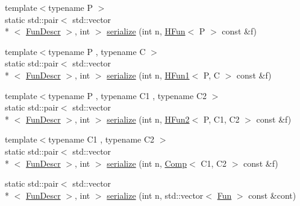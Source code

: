 \begin{DoxyCompactItemize}
\item 
{\footnotesize template$<$typename P $>$ }\\static std\+::pair$<$ std\+::vector\\*
$<$ \hyperlink{structpfq__lang_1_1FunDescr}{Fun\+Descr} $>$, int $>$ \hyperlink{namespacepfq__lang_1_1term_a5cb0871466843f156dd63407d108cf64}{serialize} (int n, \hyperlink{structpfq__lang_1_1term_1_1HFun}{H\+Fun}$<$ P $>$ const \&f)
\item 
{\footnotesize template$<$typename P , typename C $>$ }\\static std\+::pair$<$ std\+::vector\\*
$<$ \hyperlink{structpfq__lang_1_1FunDescr}{Fun\+Descr} $>$, int $>$ \hyperlink{namespacepfq__lang_1_1term_a6738402db5e4f8c9537909a736d4b5d9}{serialize} (int n, \hyperlink{structpfq__lang_1_1term_1_1HFun1}{H\+Fun1}$<$ P, C $>$ const \&f)
\item 
{\footnotesize template$<$typename P , typename C1 , typename C2 $>$ }\\static std\+::pair$<$ std\+::vector\\*
$<$ \hyperlink{structpfq__lang_1_1FunDescr}{Fun\+Descr} $>$, int $>$ \hyperlink{namespacepfq__lang_1_1term_a3eae5fc2875893f0101923fdb8102fe0}{serialize} (int n, \hyperlink{structpfq__lang_1_1term_1_1HFun2}{H\+Fun2}$<$ P, C1, C2 $>$ const \&f)
\item 
{\footnotesize template$<$typename C1 , typename C2 $>$ }\\static std\+::pair$<$ std\+::vector\\*
$<$ \hyperlink{structpfq__lang_1_1FunDescr}{Fun\+Descr} $>$, int $>$ \hyperlink{namespacepfq__lang_1_1term_af01be80516d757eac5c404e90afee1ce}{serialize} (int n, \hyperlink{structpfq__lang_1_1term_1_1Comp}{Comp}$<$ C1, C2 $>$ const \&f)
\item 
static std\+::pair$<$ std\+::vector\\*
$<$ \hyperlink{structpfq__lang_1_1FunDescr}{Fun\+Descr} $>$, int $>$ \hyperlink{namespacepfq__lang_1_1term_a0da0d1c391bc1f06bece1df9e025ee0e}{serialize} (int n, std\+::vector$<$ \hyperlink{structpfq__lang_1_1term_1_1Fun}{Fun} $>$ const \&cont)
\end{DoxyCompactItemize}



